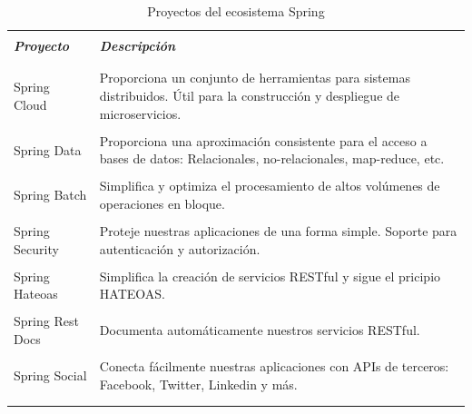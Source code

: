 		\begin{table}[H]
			\begin{tabular}{|p{4.75cm}|p{12cm}|} \hline
				 & \\
				\textit{\bfseries Proyecto} & \textit{\bfseries Descripción} \\
				 & \\ \hline
				 
				 & \\
				Spring Cloud & Proporciona un conjunto de herramientas para sistemas
				distribuidos. Útil para la construcción y despliegue de microservicios.\\
				 & \\
				 
				Spring Data & Proporciona una aproximación consistente para el acceso a
				bases de datos: Relacionales, no-relacionales, map-reduce, etc.\\
				& \\
				
				Spring Batch & Simplifica y optimiza el procesamiento de altos volúmenes
				de operaciones en bloque.\\
				& \\
				
				Spring Security & Proteje nuestras aplicaciones de una forma simple.
				Soporte para autenticación y autorización.\\
				& \\
				
				Spring Hateoas & Simplifica la creación de servicios RESTful y sigue el
				pricipio HATEOAS.\\
				& \\
				
				Spring Rest Docs & Documenta automáticamente nuestros servicios RESTful.\\
				& \\
				
				Spring Social & Conecta fácilmente nuestras aplicaciones con APIs de
				terceros: Facebook, Twitter, Linkedin y más.\\
				& \\
				
				& \\ \hline
			\end{tabular}
			\caption{Proyectos del ecosistema Spring}
		\end{table}
		
